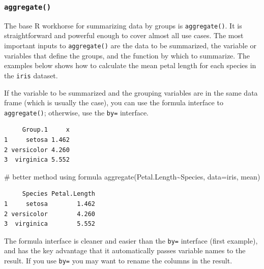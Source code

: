 \documentclass[
  13,
  letterpaper,
]{report}
\newenvironment{Shaded}{\begin{snugshade}}{\end{snugshade}}
\newcommand{\AttributeTok}[1]{\textcolor[rgb]{0.40,0.45,0.13}{#1}}
\newcommand{\CommentTok}[1]{\textcolor[rgb]{0.37,0.37,0.37}{#1}}
\newcommand{\FunctionTok}[1]{\textcolor[rgb]{0.28,0.35,0.67}{#1}}
\newcommand{\NormalTok}[1]{\textcolor[rgb]{0.00,0.23,0.31}{#1}}
\newcommand{\SpecialCharTok}[1]{\textcolor[rgb]{0.37,0.37,0.37}{#1}}
\begin{document}
\subsubsection{\texorpdfstring{\texttt{aggregate()}}{aggregate()}}\label{aggregate}

The base R workhorse for summarizing data by groups is
\texttt{aggregate()}. It is straightforward and powerful enough to cover
almost all use cases. The most important inputs to \texttt{aggregate()}
are the data to be summarized, the variable or variables that define the
groups, and the function by which to summarize. The examples below shows
how to calculate the mean petal length for each species in the
\texttt{iris} dataset.

If the variable to be summarized and the grouping variables are in the
same data frame (which is usually the case), you can use the formula
interface to \texttt{aggregate()}; otherwise, use the \texttt{by=}
interface.

\begin{Shaded}
\end{Shaded}

\begin{verbatim}
     Group.1     x
1     setosa 1.462
2 versicolor 4.260
3  virginica 5.552
\end{verbatim}

\begin{Shaded}
\begin{Highlighting}[]
\CommentTok{\# better method using formula}
\FunctionTok{aggregate}\NormalTok{(Petal.Length}\SpecialCharTok{\textasciitilde{}}\NormalTok{Species,}
          \AttributeTok{data=}\NormalTok{iris,}
\NormalTok{          mean)}
\end{Highlighting}
\end{Shaded}

\begin{verbatim}
     Species Petal.Length
1     setosa        1.462
2 versicolor        4.260
3  virginica        5.552
\end{verbatim}

The formula interface is cleaner and easier than the \texttt{by=}
interface (first example), and has the key advantage that it
automatically passes variable names to the result. If you use
\texttt{by=} you may want to rename the columns in the result.
\end{document}
